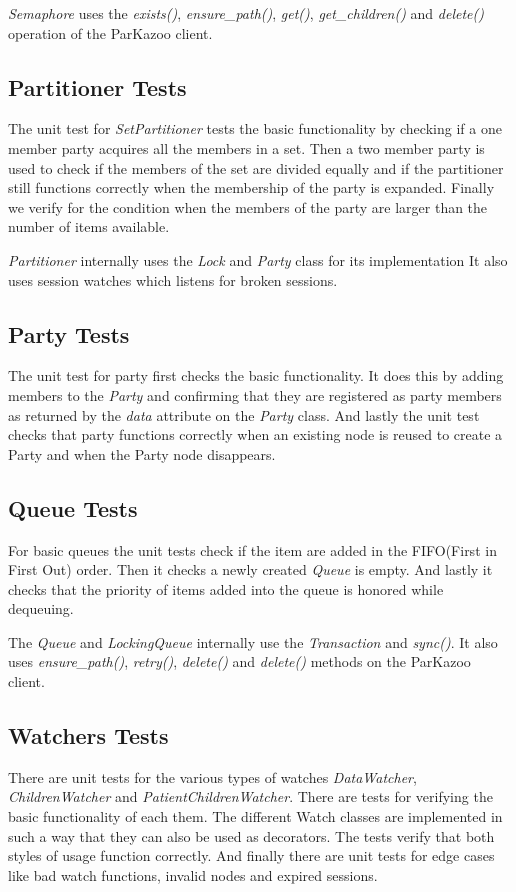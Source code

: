 \textit{Semaphore} uses the \textit{exists()}, \textit{ensure\_path()}, \textit{get()}, \textit{get\_children()} and \textit{delete()} operation of the ParKazoo client.  

\subsection{Partitioner Tests}
The unit test for \textit{SetPartitioner} tests the basic functionality by checking if a one member party acquires all the members in a set. Then a two member party is used to check if the members of the set are divided equally and if the partitioner still functions correctly when the membership of the party is expanded. Finally we verify for the condition when the members of the party are larger than the number of items available. 

\textit{Partitioner} internally uses the \textit{Lock} and \textit{Party} class for its implementation It also uses session watches which listens for broken sessions. 

\subsection{Party Tests}
The unit test for party first checks the basic functionality. It does this by adding members to the \textit{Party} and confirming that they are registered as party members as returned by the \textit{data} attribute on the \textit{Party} class. And lastly the unit test checks that party functions correctly when an existing node is reused to create a Party and when the Party node disappears.

\subsection{Queue Tests}
For basic queues the unit tests check if the item are added in the FIFO(First in First Out) order. Then it checks a newly created \textit{Queue} is empty. And lastly it checks that the priority of items added into the queue is honored while dequeuing.

The \textit{Queue} and \textit{LockingQueue} internally use the \textit{Transaction} and \textit{sync()}. It also uses \textit{ensure\_path()}, \textit{retry()}, \textit{delete()} and \textit{delete()} methods on the ParKazoo client.

\subsection{Watchers Tests}
There are unit tests for the various types of watches \textit{DataWatcher}, \textit{ChildrenWatcher} and \textit{PatientChildrenWatcher}. There are tests for verifying the basic functionality of each them. The different Watch classes are implemented in such a way that they can also be used as decorators. The tests verify that both styles of usage function correctly. And finally there are unit tests for edge cases like bad watch functions, invalid nodes and expired sessions.

